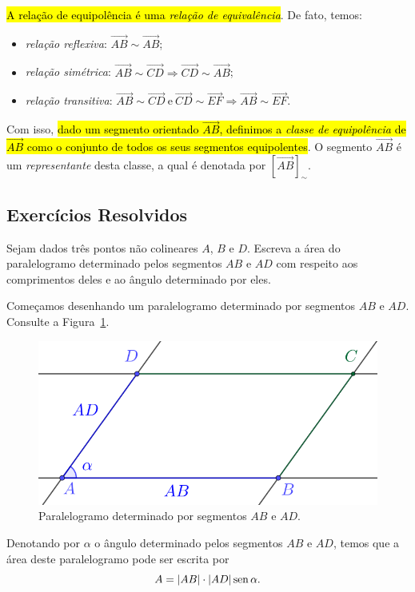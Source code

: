 \hl{A relação de equipolência é uma \emph{relação de equivalência}}. De fato, temos:
\begin{itemize}
\item \emph{relação reflexiva}: $\overrightarrow{AB} \sim \overrightarrow{AB}$;
\item \emph{relação simétrica}: $\overrightarrow{AB} \sim \overrightarrow{CD} \Rightarrow \overrightarrow{CD} \sim \overrightarrow{AB}$;
\item \emph{relação transitiva}: $\overrightarrow{AB} \sim \overrightarrow{CD} ~ \text{e} ~ \overrightarrow{CD} \sim \overrightarrow{EF} \Rightarrow \overrightarrow{AB} \sim \overrightarrow{EF}$.
\end{itemize}

Com isso, \hl{dado um segmento orientado $\overrightarrow{AB}$, definimos a \emph{classe de equipolência} de $\overrightarrow{AB}$ como o conjunto de todos os seus segmentos equipolentes}. O segmento $\overrightarrow{AB}$ é um \emph{representante} desta classe, a qual é denotada por $\left[\overrightarrow{AB}\right]_{\sim}$.

\subsection{Exercícios Resolvidos}

\begin{exeresol}
  Sejam dados três pontos não colineares $A$, $B$ e $D$. Escreva a área do paralelogramo determinado pelos segmentos $AB$ e $AD$ com respeito aos comprimentos deles e ao ângulo determinado por eles.
\end{exeresol}
\begin{resol}
  Começamos desenhando um paralelogramo determinado por segmentos $AB$ e $AD$. Consulte a Figura~\ref{cap_vetor_sec_segorien:fig:exeresol_paralelogramo}.

  \begin{figure}[H]
    \centering
    \includegraphics{./cap_vetor/dados/fig_exeresol_paralelogramo/fig.png}
    \caption{Paralelogramo determinado por segmentos $AB$ e $AD$.}
    \label{cap_vetor_sec_segorien:fig:exeresol_paralelogramo}
  \end{figure}

  Denotando por $\alpha$ o ângulo determinado pelos segmentos $AB$ e $AD$, temos que a área deste paralelogramo pode ser escrita por
  \begin{equation}
    A = |AB|\cdot |AD| \operatorname{sen} \alpha.
  \end{equation}
\end{resol}

